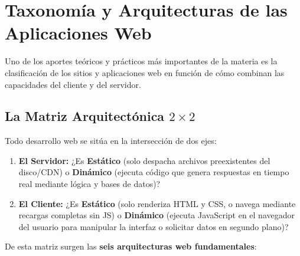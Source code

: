 \section{Taxonomía y Arquitecturas de las Aplicaciones Web}

Uno de los aportes teóricos y prácticos más importantes de la materia es la clasificación de los sitios y aplicaciones web en función de cómo combinan las capacidades del cliente y del servidor.

\subsection{La Matriz Arquitectónica \texorpdfstring{$2\times 2$}{2x2}}

Todo desarrollo web se sitúa en la intersección de dos ejes:
\begin{enumerate}
  \item \textbf{El Servidor:} ¿Es \textbf{Estático} (solo despacha archivos preexistentes del disco/CDN) o \textbf{Dinámico} (ejecuta código que genera respuestas en tiempo real mediante lógica y bases de datos)?
  \item \textbf{El Cliente:} ¿Es \textbf{Estático} (solo renderiza HTML y CSS, o navega mediante recargas completas sin JS) o \textbf{Dinámico} (ejecuta JavaScript en el navegador del usuario para manipular la interfaz o solicitar datos en segundo plano)?
\end{enumerate}

De esta matriz surgen las \textbf{seis arquitecturas web fundamentales}:

